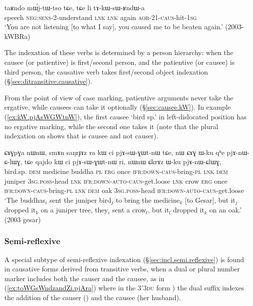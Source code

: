 \begin{exe}
\ex \label{ex:tAkWsWRndWa}
\gll taʁndo mɯ́j-tɯ-tso tɕe, tɕe li tɤ-kɯ-sɯ-ʁndɯ-a \\
speech \textsc{neg}:\textsc{sens}-2-understand \textsc{lnk} \textsc{lnk} again \textsc{aor}-2\fl{}1-\textsc{caus}-hit-\textsc{1sg} \\
\glt `You are not listening [to what I say], you caused me to be beaten again.' (2003-kWBRa)
\end{exe}

The indexation of these verbs is determined by a person hierarchy: when the causee (or patientive) is first/second person, and the patientive (or causee)  is third person, the causative verb takes first/second object indexation (§\ref{sec:ditransitive.causative}).

From the point of view of case marking, patientive arguments never take the ergative, while causees can take it optionally (§\ref{sec:causee.kW}). In example  (\ref{ex:kW.pjAsWGWtnW}), the first causee  `bird sp.' in left-dislocated position has no ergative marking, while the second one  takes it (note that the plural indexation on  shows that  is causee and not causer).
 
\begin{exe}
\ex \label{ex:kW.pjAsWGWtnW}
\gll ɕɤɣpɣa nɯnɯ, smɤn saŋrɟɤz ra kɯ ci pjɤ-sɯ-ɣɯt-nɯ tɕe, nɯ ɕɤɣ ɯ-ku qʰe pjɤ-nɯ-ɕ-lɯɣ, tɕe qajdo kɯ ci pjɤ-sɯ-ɣɯt-nɯ ri, nɯnɯ ɕkrɤz ɯ-ku pjɤ-nɯ-ɕlɯɣ, \\
bird.sp. \textsc{dem} medicine buddha \textsc{pl} \textsc{erg} once \textsc{ifr}:\textsc{down}-\textsc{caus}-bring-\textsc{pl} \textsc{lnk} \textsc{dem} juniper \textsc{3sg}.\textsc{poss}-head \textsc{lnk} \textsc{ifr}:\textsc{down}-\textsc{auto}-\textsc{caus}-get.loose \textsc{lnk} crow \textsc{erg} once \textsc{ifr}:\textsc{down}-\textsc{caus}-bring-\textsc{pl} \textsc{lnk} \textsc{dem} oak \textsc{3sg}.\textsc{poss}-head  \textsc{ifr}:\textsc{down}-\textsc{auto}-\textsc{caus}-get.loose  \\
\glt `The buddhas$_i$ sent the juniper bird$_j$ to bring the medicine$_k$ [to Gesar], but it$_j$  dropped it$_k$ on a juniper tree, they$_i$ sent a crow$_l$, but it$_l$ dropped it$_k$ on an oak.' (2003 gesar)
\end{exe}

\subsubsection{Semi-reflexive} \label{sec:sig.caus.semi.reflexive}
 
A special subtype of semi-reflexive indexation (§\ref{sec:incl.semi.reflexive}) is found in causative forms derived from transitive verbs, when a dual or plural number marker includes both the causer and the causee, as in (\ref{ex:toWGsWndzandZi.pjAra}) where in the 3$'$\fl{}\textsc{3du} form ) the dual suffix indexes the addition of the causer () and the causee (her husband).

